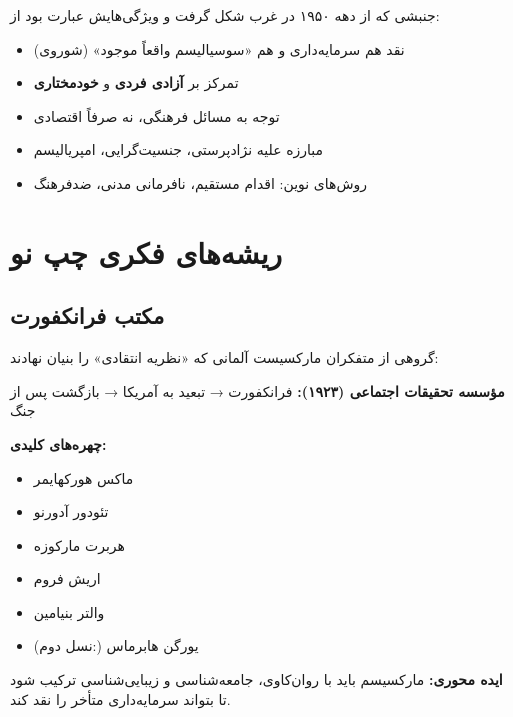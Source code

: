 \begin{defbox}[تعریف: چپ نو]
جنبشی که از دهه ۱۹۵۰ در غرب شکل گرفت و ویژگی‌هایش عبارت بود از:
\begin{itemize}[nosep]
    \item نقد هم سرمایه‌داری و هم «سوسیالیسم واقعاً موجود» (شوروی)
    \item تمرکز بر \textbf{آزادی فردی} و \textbf{خودمختاری}
    \item توجه به مسائل فرهنگی، نه صرفاً اقتصادی
    \item مبارزه علیه نژادپرستی، جنسیت‌گرایی، امپریالیسم
    \item روش‌های نوین: اقدام مستقیم، نافرمانی مدنی، ضدفرهنگ
\end{itemize}
\end{defbox}

\section{ریشه‌های فکری چپ نو}

\subsection{مکتب فرانکفورت}

\begin{historybox}
گروهی از متفکران مارکسیست آلمانی که «نظریه انتقادی» را بنیان نهادند:

\textbf{مؤسسه تحقیقات اجتماعی (۱۹۲۳):} فرانکفورت → تبعید به آمریکا → بازگشت پس از جنگ

\textbf{چهره‌های کلیدی:}
\begin{itemize}[nosep]
    \item ماکس هورکهایمر
    \item تئودور آدورنو
    \item هربرت مارکوزه
    \item اریش فروم
    \item والتر بنیامین
    \item (نسل دوم:) یورگن هابرماس
\end{itemize}

\textbf{ایده محوری:} مارکسیسم باید با روان‌کاوی، جامعه‌شناسی و زیبایی‌شناسی ترکیب شود تا بتواند سرمایه‌داری متأخر را نقد کند.
\end{historybox}

